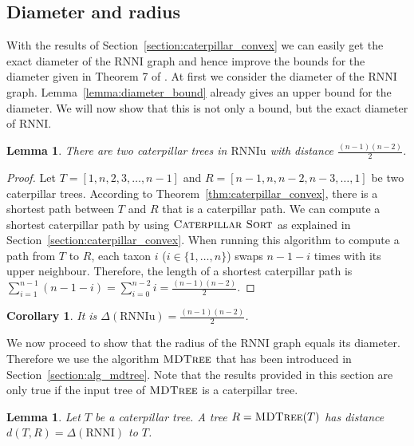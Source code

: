 \documentclass{amsart}
\newcommand{\rnni}{\mathrm{RNNI}}
\newcommand{\rnniu}{\mathrm{RNNIu}}
\newcommand{\csort}{\textsc{Caterpillar Sort}}
\newcommand{\mdtree}{\textsc{MDTree}}
\newtheorem{lemma}[definition]{Lemma}
\newtheorem{corollary}[definition]{Corollary}
\begin{document}
\subsection{Diameter and radius}
\label{section:diameter}

With the results of Section~\ref{section:caterpillar_convex} we can easily get the exact diameter of the $\rnni$ graph and hence improve the bounds for the diameter given in Theorem 7 of \autocite{Gavryushkin2018-ol}.
At first we consider the diameter of the $\rnni$ graph.
Lemma~\ref{lemma:diameter_bound} already gives an upper bound for the diameter.
We will now show that this is not only a bound, but the exact diameter of $\rnni$.

\begin{lemma}
	There are two caterpillar trees in $\rnniu$ with distance $\frac{(n-1)(n-2)}{2}$.
	\label{lemma:caterpillar_diameter}
\end{lemma}

\begin{proof}
	Let $T = [1,n,2,3,\ldots,n-1]$ and $R = [n-1,n,n-2,n-3, \ldots, 1]$ be two caterpillar trees.
    According to Theorem~\ref{thm:caterpillar_convex}, there is a shortest path between $T$ and $R$ that is a caterpillar path.
    We can compute a shortest caterpillar path by using $\csort$ as explained in Section~\ref{section:caterpillar_convex}.
    When running this algorithm to compute a path from $T$ to $R$, each taxon $i$ ($i \in \{1, \ldots, n\}$) swaps $n-1-i$ times with its upper neighbour.
    Therefore, the length of a shortest caterpillar path is $\sum\limits_{i=1}^{n-1}(n-1-i) = \sum\limits_{i=0}^{n-2}i = \frac{(n-1)(n-2)}{2}$.
\end{proof}

\begin{corollary}
    It is $\Delta(\rnniu) = \frac{(n-1)(n-2)}{2}$.
    \label{corollary:diameter}
\end{corollary}

We now proceed to show that the radius of the $\rnni$ graph equals its diameter.
Therefore we use the algorithm $\mdtree$ that has been introduced in Section~\ref{section:alg_mdtree}.
Note that the results provided in this section are only true if the input tree of $\mdtree$ is a caterpillar tree.

\begin{lemma}
    Let $T$ be a caterpillar tree.
    A tree $R = \mdtree(T)$ has distance $d(T,R) = \Delta(\rnni)$ to $T$.
    \label{lemma:max_dist_caterpillar}
\end{lemma}
\end{document}
